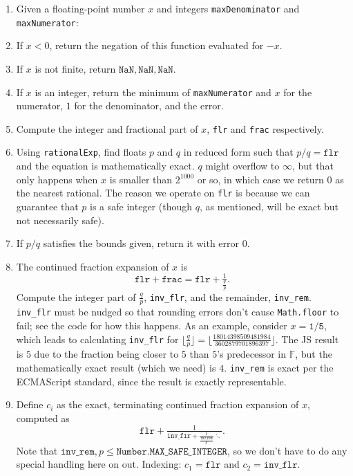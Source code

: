 \documentclass{article}
\newcommand{\NaN}{\texttt{NaN}}
\newcommand{\finitefp}{\mathbb{F}}
\begin{document}
\begin{enumerate}[label=(\alph*)]
  \item Given a floating-point number $x$ and integers \texttt{maxDenominator} and \texttt{maxNumerator}:
  \item If $x < 0$, return the negation of this function evaluated for $-x$.
  \item If $x$ is not finite, return $\NaN, \NaN, \NaN$.
  \item If $x$ is an integer, return the minimum of \texttt{maxNumerator} and $x$ for the numerator, $1$ for the denominator, and the error.
  \item Compute the integer and fractional part of $x$, \texttt{flr} and \texttt{frac} respectively.
  \item Using \texttt{rationalExp}, find floats $p$ and $q$ in reduced form such that $p/q=\texttt{flr}$ and the equation is mathematically exact. $q$ might overflow to $\infty$, but that only happens when $x$ is smaller than $2^{1000}$ or so, in which case we return $0$ as the nearest rational. The reason we operate on \texttt{flr} is because we can guarantee that $p$ is a safe integer (though $q$, as mentioned, will be exact but not necessarily safe).
  \item If $p/q$ satisfies the bounds given, return it with error $0$.
  \item The continued fraction expansion of $x$ is $$\texttt{flr} + \texttt{frac}=\texttt{flr} + \tfrac{1}{\tfrac{q}{p}}.$$ Compute the integer part of $\frac{q}{p}$, \texttt{inv\_flr}, and the remainder, \texttt{inv\_rem}. \texttt{inv\_flr} must be nudged so that rounding errors don't cause \texttt{Math.floor} to fail; see the code for how this happens. As an example, consider $x=\texttt{1/5}$, which leads to calculating \texttt{inv\_flr} for $\lfloor\frac{q}{p}\rfloor=\lfloor\frac{18014398509481984}{3602879701896397}\rfloor$. The JS result is $5$ due to the fraction being closer to $5$ than $5$'s predecessor in $\finitefp$, but the mathematically exact result (which we need) is $4$. \texttt{inv\_rem} is exact per the ECMAScript standard, since the result is exactly representable.
  \item Define $c_i$ as the exact, terminating continued fraction expansion of $x$, computed as $$\texttt{flr} + \tfrac{1}{\texttt{inv\_flr} + \tfrac{1}{\tfrac{\texttt{inv\_rem}}{p}}\ddots}.$$ Note that $\texttt{inv\_rem},p \leq \texttt{Number.MAX\_SAFE\_INTEGER}$, so we don't have to do any special handling here on out. Indexing: $c_1 = \texttt{flr}$ and $c_2 = \texttt{inv\_flr}$.

\end{enumerate}
\end{document}
